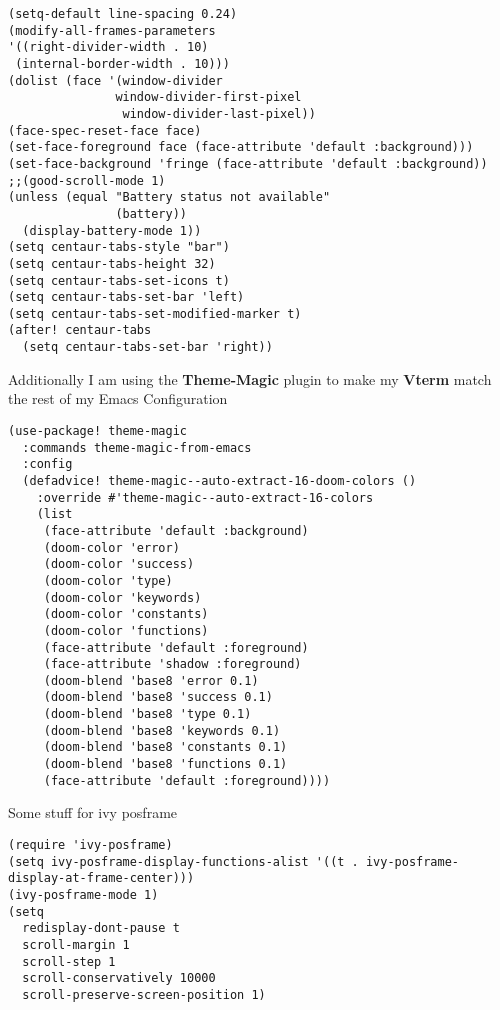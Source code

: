 \documentclass[11pt]{article}
\begin{document}
\begin{verbatim}
(setq-default line-spacing 0.24)
(modify-all-frames-parameters
'((right-divider-width . 10)
 (internal-border-width . 10)))
(dolist (face '(window-divider
               window-divider-first-pixel
                window-divider-last-pixel))
(face-spec-reset-face face)
(set-face-foreground face (face-attribute 'default :background)))
(set-face-background 'fringe (face-attribute 'default :background))
;;(good-scroll-mode 1)
(unless (equal "Battery status not available"
               (battery))
  (display-battery-mode 1))
(setq centaur-tabs-style "bar")
(setq centaur-tabs-height 32)
(setq centaur-tabs-set-icons t)
(setq centaur-tabs-set-bar 'left)
(setq centaur-tabs-set-modified-marker t)
(after! centaur-tabs
  (setq centaur-tabs-set-bar 'right))
\end{verbatim}
Additionally I am using the \textbf{Theme-Magic} plugin to make my \textbf{Vterm} match the rest of my Emacs Configuration
\begin{verbatim}
(use-package! theme-magic
  :commands theme-magic-from-emacs
  :config
  (defadvice! theme-magic--auto-extract-16-doom-colors ()
    :override #'theme-magic--auto-extract-16-colors
    (list
     (face-attribute 'default :background)
     (doom-color 'error)
     (doom-color 'success)
     (doom-color 'type)
     (doom-color 'keywords)
     (doom-color 'constants)
     (doom-color 'functions)
     (face-attribute 'default :foreground)
     (face-attribute 'shadow :foreground)
     (doom-blend 'base8 'error 0.1)
     (doom-blend 'base8 'success 0.1)
     (doom-blend 'base8 'type 0.1)
     (doom-blend 'base8 'keywords 0.1)
     (doom-blend 'base8 'constants 0.1)
     (doom-blend 'base8 'functions 0.1)
     (face-attribute 'default :foreground))))
\end{verbatim}

Some stuff for ivy posframe
\begin{verbatim}
(require 'ivy-posframe)
(setq ivy-posframe-display-functions-alist '((t . ivy-posframe-display-at-frame-center)))
(ivy-posframe-mode 1)
(setq
  redisplay-dont-pause t
  scroll-margin 1
  scroll-step 1
  scroll-conservatively 10000
  scroll-preserve-screen-position 1)
\end{verbatim}
\end{document}
